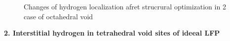 \begin{figure}[ht]
\begin{minipage}[h]{0.49\linewidth}
\end{minipage}
\hfill
\begin{minipage}[ht]{0.49\linewidth}
\end{minipage}
\caption{Changes of hydrogen localization afret strucrural optimization in 2 case of octahedral void}
\label{ris:oct2}
\end{figure}


\textbf{2. Interstitial hydrogen in tetrahedral void sites of ideeal LFP}

